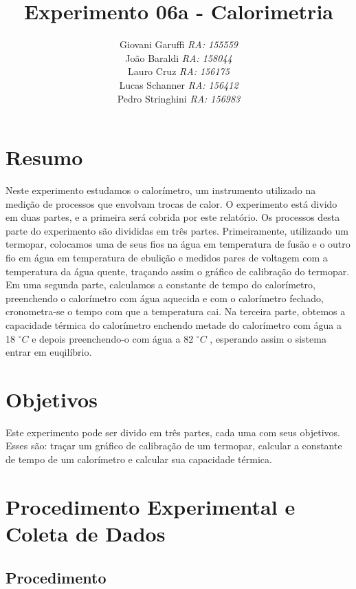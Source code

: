 \documentclass[12pt,a4paper]{article}
\begin{document}
\title{\vspace{70mm}\Huge Experimento 06a - Calorimetria}
\author{ Giovani Garuffi\qquad\hfill
		\textit {RA: 155559}\protect\\
		João Baraldi\hfill
		\textit{RA: 158044}\protect\\
		Lauro Cruz\hfill
		\textit{RA: 156175}\protect\\
		Lucas Schanner\hfill
		\textit{RA: 156412}\protect\\
		Pedro Stringhini\hfill
		\textit {RA: 156983}								
		}
\maketitle
\newpage
\section{Resumo}
Neste experimento estudamos o calorímetro, um instrumento utilizado na medição de processos que envolvam trocas de calor.
O experimento está divido em duas partes, e a primeira será cobrida por este relatório. Os processos desta parte do experimento são divididas em três partes. Primeiramente, utilizando um termopar, colocamos uma de seus fios na água em temperatura de fusão e o outro fio em água em temperatura de ebulição e medidos pares de voltagem com a temperatura da água quente, traçando assim o gráfico de calibração do termopar.
Em uma segunda parte, calculamos a constante de tempo do calorímetro, preenchendo o calorímetro com água aquecida e com o calorímetro fechado, cronometra-se o tempo com que a temperatura cai.
Na terceira parte, obtemos a capacidade térmica do calorímetro enchendo metade do calorímetro com água a 18 $^{\circ}C$ e depois preenchendo-o com água a 82 $^{\circ}C$ , esperando assim o sistema entrar em euqilíbrio.

\section{Objetivos}
Este experimento pode ser divido em três partes, cada uma com seus objetivos. Esses são: traçar um gráfico de calibração de um termopar, calcular a constante de tempo de um calorímetro e calcular sua capacidade térmica.


\section{Procedimento Experimental e Coleta de Dados}


\subsection{Procedimento}
\end{document}
